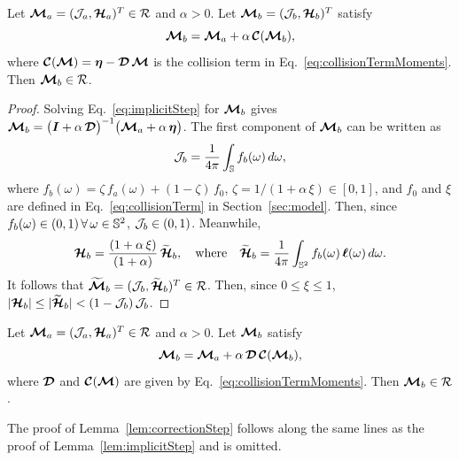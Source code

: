 \begin{lemma}
  Let $\boldsymbol{\mathcal{M}}_{a}=(\mathcal{J}_{a},\boldsymbol{\mathcal{H}}_{a})^{T}\in\mathcal{R}$ and $\alpha>0$.  
  Let $\boldsymbol{\mathcal{M}}_{b}=(\mathcal{J}_{b},\boldsymbol{\mathcal{H}}_{b})^{T}$ satisfy
  \begin{equation}
    \boldsymbol{\mathcal{M}}_{b}=\boldsymbol{\mathcal{M}}_{a}+\alpha\,\boldsymbol{\mathcal{C}}(\boldsymbol{\mathcal{M}}_{b}), 
    \label{eq:implicitStep}
  \end{equation}
  where $\boldsymbol{\mathcal{C}}(\boldsymbol{\mathcal{M}})=\boldsymbol{\eta}-\boldsymbol{\mathcal{D}}\,\boldsymbol{\mathcal{M}}$ is the collision term in Eq.~\eqref{eq:collisionTermMoments}.  
  Then $\boldsymbol{\mathcal{M}}_{b}\in\mathcal{R}$.  
  \label{lem:implicitStep}
\end{lemma}
\begin{proof}
  Solving Eq.~\eqref{eq:implicitStep} for $\boldsymbol{\mathcal{M}}_{b}$ gives $\boldsymbol{\mathcal{M}}_{b} = \big(\boldsymbol{I}+\alpha\,\boldsymbol{\mathcal{D}}\big)^{-1}\big(\boldsymbol{\mathcal{M}}_{a}+\alpha\,\boldsymbol{\eta}\big)$.  
  The first component of $\boldsymbol{\mathcal{M}}_{b}$ can be written as
  \begin{equation*}
    \mathcal{J}_{b}=\frac{1}{4\pi}\int_{\mathbb{S}}f_{b}(\omega)\,d\omega,
  \end{equation*}
  where $f_{b}(\omega)=\zeta\,f_{a}(\omega)+(1-\zeta)\,f_{0}$, $\zeta=1/(1+\alpha\,\xi)\in[0,1]$, and $f_{0}$ and $\xi$ are defined in Eq.~\eqref{eq:collisionTerm} in Section~\ref{sec:model}.  
  Then, since $f_{b}(\omega)\in(0,1)\,\forall\,\omega\in\mathbb{S}^{2}$, $\mathcal{J}_{b}\in(0,1)$.  
  Meanwhile, 
  \begin{equation*}
    \boldsymbol{\mathcal{H}}_{b}=\frac{(1+\alpha\,\xi)}{(1+\alpha)}\,\widetilde{\boldsymbol{\mathcal{H}}}_{b},
    \quad\text{where}\quad
    \widetilde{\boldsymbol{\mathcal{H}}}_{b}=\frac{1}{4\pi}\int_{\mathbb{S}^{2}}f_{b}(\omega)\,\boldsymbol{\ell}(\omega)\,d\omega.  
  \end{equation*}
  It follows that $\widetilde{\boldsymbol{\boldsymbol{\mathcal{M}}}}_{b}=(\mathcal{J}_{b},\widetilde{\boldsymbol{\mathcal{H}}}_{b})^{T}\in\mathcal{R}$.  
  Then, since $0\le\xi\le1$, $|\boldsymbol{\mathcal{H}}_{b}|\le|\widetilde{\boldsymbol{\mathcal{H}}}_{b}| < (1-\mathcal{J}_{b})\,\mathcal{J}_{b}$.  
\end{proof}

\begin{lemma}
  Let $\boldsymbol{\mathcal{M}}_{a}=(\mathcal{J}_{a},\boldsymbol{\mathcal{H}}_{a})^{T}\in\mathcal{R}$ and $\alpha>0$.  
  Let $\boldsymbol{\mathcal{M}}_{b}$ satisfy
  \begin{equation*}
    \boldsymbol{\mathcal{M}}_{b}=\boldsymbol{\mathcal{M}}_{a}+\alpha\,\boldsymbol{\mathcal{D}}\,\boldsymbol{\mathcal{C}}(\boldsymbol{\mathcal{M}}_{b}),    
  \end{equation*}
  where $\boldsymbol{\mathcal{D}}$ and $\boldsymbol{\mathcal{C}}(\boldsymbol{\mathcal{M}})$ are given by Eq.~\eqref{eq:collisionTermMoments}.  
  Then $\boldsymbol{\mathcal{M}}_{b}\in\mathcal{R}$.  
  \label{lem:correctionStep}
\end{lemma}
The proof of Lemma~\ref{lem:correctionStep} follows along the same lines as the proof of Lemma~\ref{lem:implicitStep} and is omitted.  
